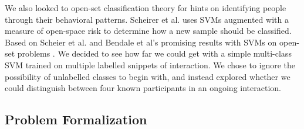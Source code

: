 \documentclass[conference]{IEEEtran}
\begin{document}
We also looked to open-set classification theory for hints on identifying people through their behavioral patterns. Scheirer et al. uses SVMs augmented with a measure of open-space risk to determine how a new sample should be classified\cite{scheirer_toward_2013}. Based on Scheier et al. and Bendale et al's promising results with SVMs on open-set problems \cite{bendale_towards_2015}\cite{scheirer_toward_2013}. We decided to see how far we could get with a simple multi-class SVM trained on multiple labelled snippets of interaction. We chose to ignore the possibility of unlabelled classes to begin with, and instead explored whether we could distinguish between four known participants in an ongoing interaction. 


\subsection{Problem Formalization}
\end{document}
